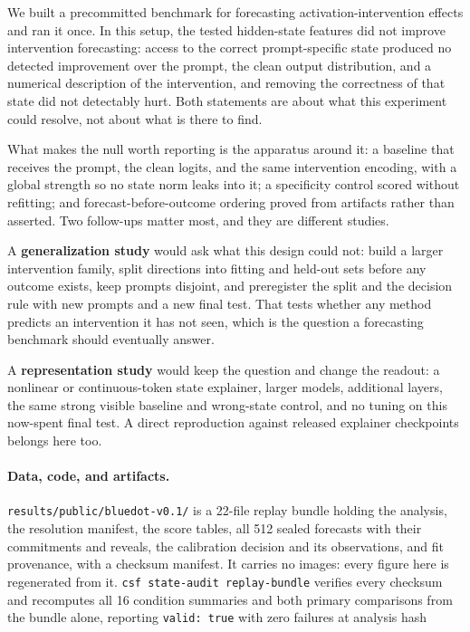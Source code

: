 \documentclass{article}
\begin{document}
We built a precommitted benchmark for forecasting activation-intervention effects and ran it once.
In this setup, the tested hidden-state features did not improve intervention forecasting: access to
the correct prompt-specific state produced no detected improvement over the prompt, the clean output
distribution, and a numerical description of the intervention, and removing the correctness of that
state did not detectably hurt. Both statements are about what this experiment could resolve, not
about what is there to find.

What makes the null worth reporting is the apparatus around it: a baseline that receives the prompt,
the clean logits, and the same intervention encoding, with a global strength so no state norm leaks
into it; a specificity control scored without refitting; and forecast-before-outcome ordering proved
from artifacts rather than asserted. Two follow-ups matter most, and they are different studies.

A \textbf{generalization study} would ask what this design could not: build a larger intervention
family, split directions into fitting and held-out sets before any outcome exists, keep prompts
disjoint, and preregister the split and the decision rule with new prompts and a new final test.
That tests whether any method predicts an intervention it has not seen, which is the question a
forecasting benchmark should eventually answer.

A \textbf{representation study} would keep the question and change the readout: a nonlinear or
continuous-token state explainer, larger models, additional layers, the same strong visible baseline
and wrong-state control, and no tuning on this now-spent final test. A direct reproduction against
released explainer checkpoints belongs here too.

\paragraph{Data, code, and artifacts.} \texttt{results/public/bluedot-v0.1/} is a 22-file replay
bundle holding the analysis, the resolution manifest, the score tables, all 512 sealed forecasts
with their commitments and reveals, the calibration decision and its observations, and fit
provenance, with a checksum manifest. It carries no images: every figure here is regenerated from
it. \texttt{csf state-audit replay-bundle} verifies every checksum and recomputes all 16 condition
summaries and both primary comparisons from the bundle alone, reporting \texttt{valid: true} with
zero failures at analysis hash
\end{document}
